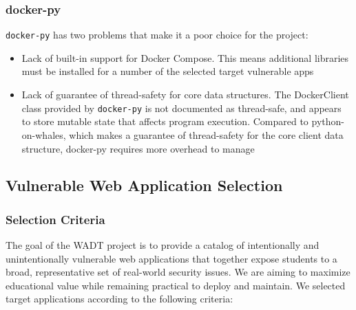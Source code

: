 \documentclass[12pt,titlepage]{article}
\begin{document}
\subsubsection{docker-py}
\texttt{docker-py} has two problems that make it a poor choice for the project:
\begin{itemize}
	\item Lack of built-in support for Docker Compose. This means additional libraries must be installed for a number of the selected target vulnerable apps
	\item Lack of guarantee of thread-safety for core data structures. The DockerClient class provided by \texttt{docker-py} is not documented as thread-safe, and appears to store mutable state that affects program execution. Compared to python-on-whales, which makes a guarantee of thread-safety for the core client data structure, docker-py requires more overhead to manage
\end{itemize}

\subsection{Vulnerable Web Application Selection}

\subsubsection{Selection Criteria}
The goal of the WADT project is to provide a catalog of intentionally and unintentionally vulnerable web applications that together expose students to a broad, representative set of real-world security issues. We are aiming to maximize educational value while remaining practical to deploy and maintain. We selected target applications according to the following criteria:
\end{document}
